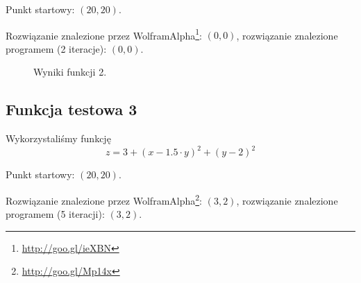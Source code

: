 \documentclass{classrep}
\begin{document}
Punkt startowy: $(20, 20)$.

Rozwiązanie znalezione przez WolframAlpha\footnote{\url{http://goo.gl/ieXBN}}: $(0, 0)$, rozwiązanie znalezione programem (2 iteracje): $(0, 0)$.

\begin{figure}
\noindent{}
\caption{Wyniki funkcji 2.}
\end{figure}

\subsection{Funkcja testowa 3}
Wykorzystaliśmy funkcję
\begin{equation}
  z = 3 + (x - 1.5 \cdot y)^2 + (y - 2)^2
\end{equation}

Punkt startowy: $(20, 20)$.

Rozwiązanie znalezione przez WolframAlpha\footnote{\url{http://goo.gl/Mp14x}}: $(3, 2)$, rozwiązanie znalezione programem (5 iteracji): $(3, 2)$.
\end{document}
